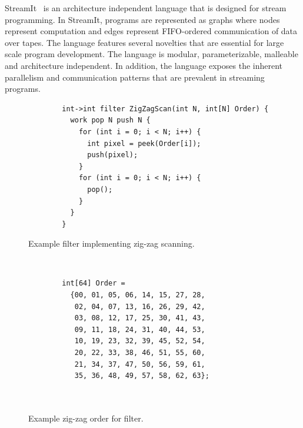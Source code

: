 \label{sec:streamit}

StreamIt~\cite{streamitcc} is an architecture independent language
that is designed for stream programming. In StreamIt, programs are
represented as graphs where nodes represent computation and edges
represent FIFO-ordered communication of data over tapes. The language
features several novelties that are essential for large scale program
development. The language is modular, parameterizable, malleable and
architecture independent. In addition, the language exposes the
inherent parallelism and communication patterns that are prevalent in
streaming programs.

\begin{figure}[t]
  \begin{minipage}[t]{4.0in}
    {
	\begin{scriptsize}
	  \begin{verbatim}
	    int->int filter ZigZagScan(int N, int[N] Order) {
	      work pop N push N {
	        for (int i = 0; i < N; i++) {
	          int pixel = peek(Order[i]);
	          push(pixel);
	        }
	        for (int i = 0; i < N; i++) {
	          pop();
	        }
	      }
	    }
	  \end{verbatim}
	\end{scriptsize}
    }
    \caption{Example filter implementing zig-zag scanning.}
  \end{minipage}
  ~~\vrule~~
  \begin{minipage}[t]{3.0in}
    {  
	\begin{scriptsize}
	  \begin{verbatim}
	    int[64] Order = 
	      {00, 01, 05, 06, 14, 15, 27, 28,
	       02, 04, 07, 13, 16, 26, 29, 42,
	       03, 08, 12, 17, 25, 30, 41, 43,
	       09, 11, 18, 24, 31, 40, 44, 53,
	       10, 19, 23, 32, 39, 45, 52, 54,
	       20, 22, 33, 38, 46, 51, 55, 60,
	       21, 34, 37, 47, 50, 56, 59, 61,
	       35, 36, 48, 49, 57, 58, 62, 63};



	  \end{verbatim}
	\end{scriptsize}
    }
    \caption{Example zig-zag order for filter.}
    \label{fig:zigzag-order}
  \end{minipage}
\end{figure}

